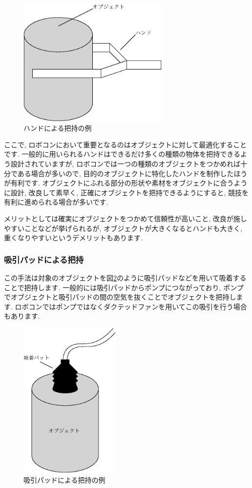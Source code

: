 \begin{figure}[h]
  \centering
  \includegraphics[width=7.5cm]{mecha/fig/hand.eps}
  \caption{ハンドによる把持の例}
  \label{fig:hand}
\end{figure}

ここで, ロボコンにおいて重要となるのはオブジェクトに対して最適化することです. 一般的に用いられるハンドはできるだけ多くの種類の物体を把持できるよう設計されていますが, ロボコンでは一つの種類のオブジェクトをつかめれば十分である場合が多いので, 目的のオブジェクトに特化したハンドを制作したほうが有利です. 
オブジェクトにふれる部分の形状や素材をオブジェクトに合うように設計, 改良して素早く, 正確にオブジェクトを把持できるようにすると, 競技を有利に進められる場合が多いです. 

メリットとしては確実にオブジェクトをつかめて信頼性が高いこと, 改良が施しやすいことなどが挙げられるが, オブジェクトが大きくなるとハンドも大きく, 重くなりやすいというデメリットもあります. 
\subsubsection{吸引パッドによる把持}
この手法は対象のオブジェクトを図\ref{fig:vacuum}のように吸引パッドなどを用いて吸着することで把持します. 
一般的には吸引パッドからポンプにつながっており, ポンプでオブジェクトと吸引パッドの間の空気を抜くことでオブジェクトを把持します. 
ロボコンではポンプではなくダクテッドファンを用いてこの吸引を行う場合もあります. 

\begin{figure}[h]
  \centering
  \includegraphics[width=5cm]{mecha/fig/vacuum.eps}
  \caption{吸引パッドによる把持の例}
  \label{fig:vacuum}
\end{figure}

